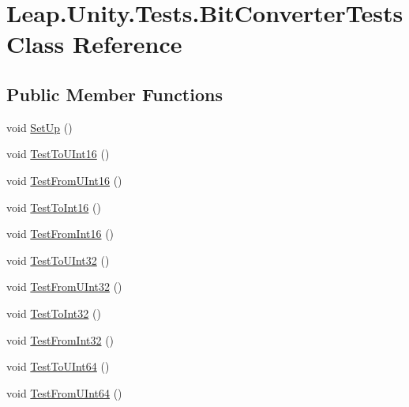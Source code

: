 \hypertarget{class_leap_1_1_unity_1_1_tests_1_1_bit_converter_tests}{}\section{Leap.\+Unity.\+Tests.\+Bit\+Converter\+Tests Class Reference}
\label{class_leap_1_1_unity_1_1_tests_1_1_bit_converter_tests}
\subsection*{Public Member Functions}
\begin{DoxyCompactItemize}
\item 
void \mbox{\hyperlink{class_leap_1_1_unity_1_1_tests_1_1_bit_converter_tests_a38158c62ddfc36d84fbf916abd532e9e}{Set\+Up}} ()
\item 
void \mbox{\hyperlink{class_leap_1_1_unity_1_1_tests_1_1_bit_converter_tests_a199ab962faeb0c63a86d308e844f6b78}{Test\+To\+U\+Int16}} ()
\item 
void \mbox{\hyperlink{class_leap_1_1_unity_1_1_tests_1_1_bit_converter_tests_a942697952b353d2a70bf6922681fc84d}{Test\+From\+U\+Int16}} ()
\item 
void \mbox{\hyperlink{class_leap_1_1_unity_1_1_tests_1_1_bit_converter_tests_a9eae1df51bd67e944cd6187e24c9970d}{Test\+To\+Int16}} ()
\item 
void \mbox{\hyperlink{class_leap_1_1_unity_1_1_tests_1_1_bit_converter_tests_a250870475d05bc5878cfd30061f4792a}{Test\+From\+Int16}} ()
\item 
void \mbox{\hyperlink{class_leap_1_1_unity_1_1_tests_1_1_bit_converter_tests_a78fec5203b5dc47a33a5735782bec30b}{Test\+To\+U\+Int32}} ()
\item 
void \mbox{\hyperlink{class_leap_1_1_unity_1_1_tests_1_1_bit_converter_tests_aa374fcee30c22855e6f4b132532567d5}{Test\+From\+U\+Int32}} ()
\item 
void \mbox{\hyperlink{class_leap_1_1_unity_1_1_tests_1_1_bit_converter_tests_a24f16755780736d9ba92617517d32cfb}{Test\+To\+Int32}} ()
\item 
void \mbox{\hyperlink{class_leap_1_1_unity_1_1_tests_1_1_bit_converter_tests_a6d4ac3673264676a8b0afad153f773b4}{Test\+From\+Int32}} ()
\item 
void \mbox{\hyperlink{class_leap_1_1_unity_1_1_tests_1_1_bit_converter_tests_ac10e4316cfdbc3172d9c402bc427833c}{Test\+To\+U\+Int64}} ()
\item 
void \mbox{\hyperlink{class_leap_1_1_unity_1_1_tests_1_1_bit_converter_tests_ade521f67ff9ce1d65c1cad2c8b625817}{Test\+From\+U\+Int64}} ()

\end{DoxyCompactItemize}
